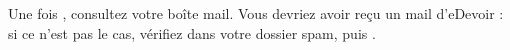﻿Une fois , consultez votre boîte mail.
Vous devriez avoir reçu un mail d’eDevoir : si ce n’est pas le cas, vérifiez dans votre dossier spam, puis .